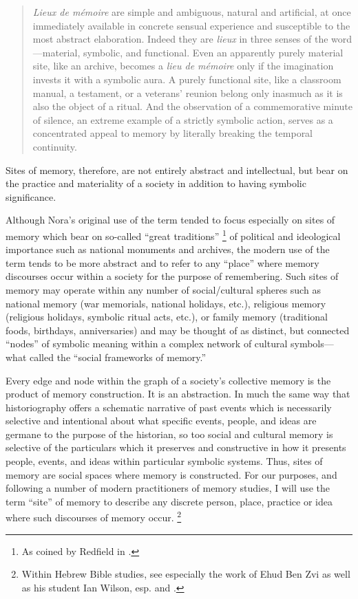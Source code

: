 \begin{quote}
    \emph{Lieux de mémoire} are simple and ambiguous, natural and artificial, at once immediately available in concrete sensual experience and susceptible to the most abstract elaboration. Indeed they are \emph{lieux} in three senses of the word---material, symbolic, and functional. Even an apparently purely material site, like an archive, becomes a \emph{lieu de mémoire} only if the imagination invests it with a symbolic aura. A purely functional site, like a classroom manual, a testament, or a veterans' reunion belong only inasmuch as it is also the object of a ritual. And the observation of a commemorative minute of silence, an extreme example of a strictly symbolic action, serves as a concentrated appeal to memory by literally breaking the temporal continuity.\autocite[18--19]{nora_representations1989}
\end{quote}

\noindent
Sites of memory, therefore, are not entirely abstract and intellectual, but bear on the practice and materiality of a society in addition to having symbolic significance.

Although Nora's original use of the term tended to focus especially on sites of memory which bear on so-called ``great traditions''%
    \footnote{As coined by Redfield in \cite*[41--42]{redfield1956}.}
of political and ideological importance such as national monuments and archives, the modern use of the term tends to be more abstract and to refer to any ``place'' where memory discourses occur within a society for the purpose of remembering. Such sites of memory may operate within any number of social/cultural spheres such as national memory (war memorials, national holidays, etc.), religious memory (religious holidays, symbolic ritual acts, etc.), or family memory (traditional foods, birthdays, anniversaries) and may be thought of as distinct, but connected ``nodes'' of symbolic meaning within a complex network of cultural symbols---what \halbwachs called the ``social frameworks of memory.''%
    \autocite[38]{halbwachs1992}  

Every edge and node within the graph of a society's collective memory is the product of memory construction. It is an abstraction. In much the same way that historiography offers a schematic narrative of past events which is necessarily selective and intentional about what specific events, people, and ideas are germane to the purpose of the historian, so too social and cultural memory is selective of the particulars which it preserves and constructive in how it presents people, events, and ideas within particular symbolic systems. Thus, sites of memory are social spaces where memory is constructed. For our purposes, and following a number of modern practitioners of memory studies, I will use the term ``site'' of memory to describe any discrete person, place, practice or idea where such discourses of memory occur.%
    \footnote{Within Hebrew Bible studies, see especially the work of Ehud Ben Zvi as well as his student Ian Wilson, esp. \cite[72--74]{benzvi_st2017} and \cite[25--26]{wilson2017}.}

